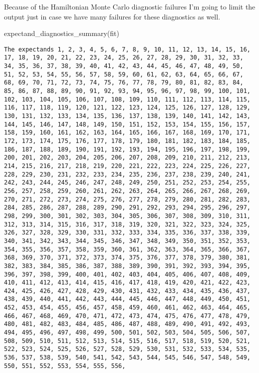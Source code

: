 \documentclass[
  letterpaper,
  DIV=11,
  numbers=noendperiod]{scrartcl}
\newenvironment{Shaded}{\begin{snugshade}}{\end{snugshade}}
\newcommand{\FunctionTok}[1]{\textcolor[rgb]{0.28,0.35,0.67}{#1}}
\newcommand{\NormalTok}[1]{\textcolor[rgb]{0.00,0.23,0.31}{#1}}
\begin{document}
Because of the Hamiltonian Monte Carlo diagnostic failures I'm going to
limit the output just in case we have many failures for these
diagnostics as well.

\begin{Shaded}
\begin{Highlighting}[]
\FunctionTok{expectand\_diagnostics\_summary}\NormalTok{(fit)}
\end{Highlighting}
\end{Shaded}

\begin{verbatim}
The expectands 1, 2, 3, 4, 5, 6, 7, 8, 9, 10, 11, 12, 13, 14, 15, 16, 17, 18, 19, 20, 21, 22, 23, 24, 25, 26, 27, 28, 29, 30, 31, 32, 33, 34, 35, 36, 37, 38, 39, 40, 41, 42, 43, 44, 45, 46, 47, 48, 49, 50, 51, 52, 53, 54, 55, 56, 57, 58, 59, 60, 61, 62, 63, 64, 65, 66, 67, 68, 69, 70, 71, 72, 73, 74, 75, 76, 77, 78, 79, 80, 81, 82, 83, 84, 85, 86, 87, 88, 89, 90, 91, 92, 93, 94, 95, 96, 97, 98, 99, 100, 101, 102, 103, 104, 105, 106, 107, 108, 109, 110, 111, 112, 113, 114, 115, 116, 117, 118, 119, 120, 121, 122, 123, 124, 125, 126, 127, 128, 129, 130, 131, 132, 133, 134, 135, 136, 137, 138, 139, 140, 141, 142, 143, 144, 145, 146, 147, 148, 149, 150, 151, 152, 153, 154, 155, 156, 157, 158, 159, 160, 161, 162, 163, 164, 165, 166, 167, 168, 169, 170, 171, 172, 173, 174, 175, 176, 177, 178, 179, 180, 181, 182, 183, 184, 185, 186, 187, 188, 189, 190, 191, 192, 193, 194, 195, 196, 197, 198, 199, 200, 201, 202, 203, 204, 205, 206, 207, 208, 209, 210, 211, 212, 213, 214, 215, 216, 217, 218, 219, 220, 221, 222, 223, 224, 225, 226, 227, 228, 229, 230, 231, 232, 233, 234, 235, 236, 237, 238, 239, 240, 241, 242, 243, 244, 245, 246, 247, 248, 249, 250, 251, 252, 253, 254, 255, 256, 257, 258, 259, 260, 261, 262, 263, 264, 265, 266, 267, 268, 269, 270, 271, 272, 273, 274, 275, 276, 277, 278, 279, 280, 281, 282, 283, 284, 285, 286, 287, 288, 289, 290, 291, 292, 293, 294, 295, 296, 297, 298, 299, 300, 301, 302, 303, 304, 305, 306, 307, 308, 309, 310, 311, 312, 313, 314, 315, 316, 317, 318, 319, 320, 321, 322, 323, 324, 325, 326, 327, 328, 329, 330, 331, 332, 333, 334, 335, 336, 337, 338, 339, 340, 341, 342, 343, 344, 345, 346, 347, 348, 349, 350, 351, 352, 353, 354, 355, 356, 357, 358, 359, 360, 361, 362, 363, 364, 365, 366, 367, 368, 369, 370, 371, 372, 373, 374, 375, 376, 377, 378, 379, 380, 381, 382, 383, 384, 385, 386, 387, 388, 389, 390, 391, 392, 393, 394, 395, 396, 397, 398, 399, 400, 401, 402, 403, 404, 405, 406, 407, 408, 409, 410, 411, 412, 413, 414, 415, 416, 417, 418, 419, 420, 421, 422, 423, 424, 425, 426, 427, 428, 429, 430, 431, 432, 433, 434, 435, 436, 437, 438, 439, 440, 441, 442, 443, 444, 445, 446, 447, 448, 449, 450, 451, 452, 453, 454, 455, 456, 457, 458, 459, 460, 461, 462, 463, 464, 465, 466, 467, 468, 469, 470, 471, 472, 473, 474, 475, 476, 477, 478, 479, 480, 481, 482, 483, 484, 485, 486, 487, 488, 489, 490, 491, 492, 493, 494, 495, 496, 497, 498, 499, 500, 501, 502, 503, 504, 505, 506, 507, 508, 509, 510, 511, 512, 513, 514, 515, 516, 517, 518, 519, 520, 521, 522, 523, 524, 525, 526, 527, 528, 529, 530, 531, 532, 533, 534, 535, 536, 537, 538, 539, 540, 541, 542, 543, 544, 545, 546, 547, 548, 549, 550, 551, 552, 553, 554, 555, 556, 
\end{verbatim}
\end{document}
